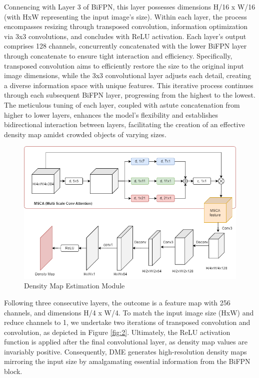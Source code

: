 \documentclass[journal]{IEEEtran}
\begin{document}
Connencing with Layer 3 of BiFPN, this layer possesses dimensions H/16 x W/16 (with HxW representing the input image's size). Within each layer, the process encompasses resizing through transposed convolution, information optimization via 3x3 convolutions, and concludes with ReLU activation. Each layer's output comprises 128 channels, concurrently concatenated with the lower BiFPN layer through concatenate to ensure tight interaction and efficiency. Specifically, transposed convolution aims to efficiently restore the size to the original input image dimensions, while the 3x3 convolutional layer adjusts each detail, creating a diverse information space with unique features. This iterative process continues through each subsequent BiFPN layer, progressing from the highest to the lowest. The meticulous tuning of each layer, coupled with astute concatenation from higher to lower layers, enhances the model's flexibility and establishes bidirectional interaction between layers, facilitating the creation of an effective density map amidst crowded objects of varying sizes.

\begin{figure}[ht]
        \centering
        \includegraphics[width=\linewidth]{Fig/densitymapmodule.png}
        \caption{Density Map Estimation Module}
        \label{attentionmap}
\end{figure}

Following three consecutive layers, the outcome is a feature map with 256 channels, and dimensions  H/4 x W/4. To match the input image size (HxW) and reduce channels to 1, we undertake two iterations of transposed convolution and convolution, as depicted in Figure \ref*{fig:2}. Ultimately, the ReLU activation function is applied after the final convolutional layer, as density map values are invariably positive. Consequently, DME generates high-resolution density maps mirroring the input size by amalgamating essential information from the BiFPN block.
\end{document}
